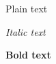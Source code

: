 \documentclass[a4paper]{article}
\begin{document}
	Plain text

	\textit{Italic text}

	\textbf{Bold text}
\end{document}
